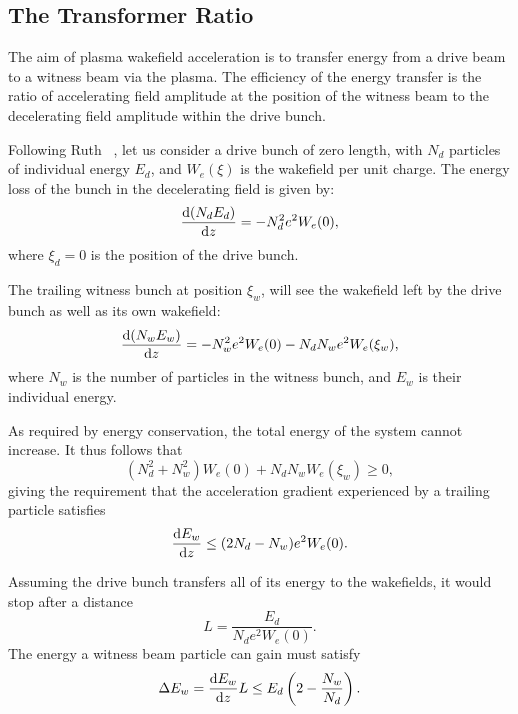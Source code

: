 \subsection{The Transformer Ratio}
\label{Int:BPI:TRat}

The aim of plasma wakefield acceleration is to transfer energy from a drive beam to a witness beam via the plasma. The efficiency of the energy transfer is the ratio of accelerating field amplitude at the position of the witness beam to the decelerating field amplitude within the drive bunch.

Following Ruth \etal~\cite{ruth:1985}, let us consider a drive bunch of zero length, with $N_{d}$ particles of individual energy $E_{d}$, and $W_{e}(\xi)$ is the wakefield per unit charge. The energy loss of the bunch in the decelerating field is given by:
\begin{equation}
    \frac{\mathrm{d} (N_{d}E_{d})}{\mathrm{d} z} = - N_{d}^{2}e^{2}W_{e}(0), \label{EQ:TRat:Drive}
\end{equation}
where $\xi_{d} = 0$ is the position of the drive bunch.

The trailing witness bunch at position $\xi_{w}$, will see the wakefield left by the drive bunch as well as its own wakefield:
\begin{equation}
    \frac{\mathrm{d} (N_{w}E_{w})}{\mathrm{d} z}
        = - N_{w}^{2}e^{2}W_{e}(0) - N_{d}N_{w}e^{2}W_{e}(\xi_{w}), \label{EQ:TRat:Witness}
\end{equation}
where $N_{w}$ is the number of particles in the witness bunch, and $E_{w}$ is their individual energy.

As required by energy conservation, the total energy of the system cannot increase. It thus follows that
\begin{equation}
    (N_{d}^{2} + N_{w}^{2})W_{e}(0) + N_{d}N_{w}W_{e}(\xi_{w}) \geq 0, \label{EQ:TRat:EConv}
\end{equation}
giving the requirement that the acceleration gradient experienced by a trailing particle satisfies
\begin{equation}
    \frac{\mathrm{d} E_{w}}{\mathrm{d} z} \leq (2N_{d} - N_{w})e^{2}W_{e}(0). \label{EQ:TRat:Grad}
\end{equation}

Assuming the drive bunch transfers all of its energy to the wakefields, it would stop after a distance
\begin{equation}
    L = \frac{E_{d}}{N_{d}e^{2}W_{e}(0)}. \label{EQ:Trat:LStop}
\end{equation}
The energy a witness beam particle can gain must satisfy
\begin{equation}
    \Delta E_{w} = \frac{\mathrm{d} E_{w}}{\mathrm{d} z}L
                 \leq E_{d}\left(2-\frac{N_{w}}{N_{d}}\right). \label{EQ:TRat:DeltaE}
\end{equation}

